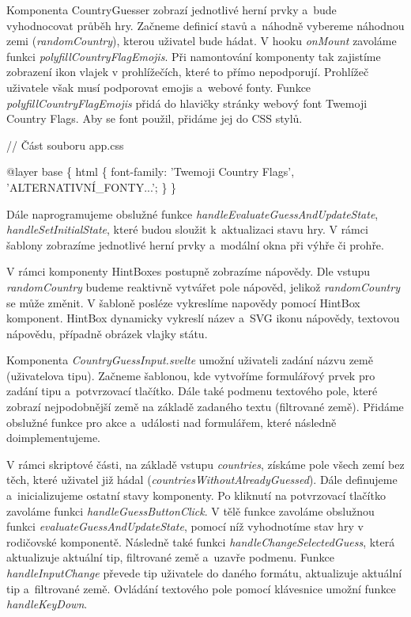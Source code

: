 Komponenta CountryGuesser zobrazí jednotlivé herní prvky a~bude vyhodnocovat průběh hry. 
Začneme definicí stavů a~náhodně vybereme náhodnou zemi (\emph{randomCountry}), kterou uživatel bude hádat. 
V hooku \emph{onMount} zavoláme funkci \emph{polyfillCountryFlagEmojis}. Při namontování komponenty tak zajistíme zobrazení ikon vlajek v prohlížečích, které to přímo nepodporují. 
Prohlížeč uživatele však musí podporovat emojis a~webové fonty. Funkce \emph{polyfillCountryFlagEmojis} přidá do hlavičky stránky webový font Twemoji Country Flags. 
Aby se font použil, přidáme jej do CSS stylů.

\begin{prog}
// Část souboru app.css

@layer base \{
  html \{
    font-family: 'Twemoji Country Flags', 'ALTERNATIVNÍ_FONTY...';
  \}
\}
\end{prog}

Dále naprogramujeme obslužné funkce \emph{handleEvaluateGuessAndUpdateState}, \emph{handleSetInitialState}, které budou sloužit k~aktualizaci stavu hry. 
V rámci šablony zobrazíme jednotlivé herní prvky a~modální okna při výhře či prohře.

V rámci komponenty HintBoxes postupně zobrazíme nápovědy. Dle vstupu \emph{randomCountry} budeme reaktivně vytvářet pole nápověd, jelikož \emph{randomCountry} se může změnit. 
V šabloně posléze vykreslíme napovědy pomocí HintBox komponent. HintBox dynamicky vykreslí název a~SVG ikonu nápovědy, textovou nápovědu, případně obrázek vlajky státu.

Komponenta \emph{CountryGuessInput.svelte} umožní uživateli zadání názvu země (uživatelova tipu). Začneme šablonou, kde vytvoříme formulářový prvek pro zadání tipu a~potvrzovací tlačítko. 
Dále také podmenu textového pole, které zobrazí nejpodobnější země na základě zadaného textu (filtrované země). Přidáme obslužné funkce pro akce a~události nad formulářem, které následně doimplementujeme.

V rámci skriptové části, na základě vstupu \emph{countries}, získáme pole všech zemí bez těch, které uživatel již hádal (\emph{countriesWithoutAlreadyGuessed}). 
Dále definujeme a~inicializujeme ostatní stavy komponenty. Po kliknutí na potvrzovací tlačítko zavoláme funkci \emph{handleGuessButtonClick}. 
V tělě funkce zavoláme obslužnou funkci \emph{evaluateGuessAndUpdateState}, pomocí níž vyhodnotíme stav hry v rodičovské komponentě. 
Následně také funkci \emph{handleChangeSelectedGuess}, která aktualizuje aktuální tip, filtrované země a~uzavře podmenu. 
Funkce \emph{handleInputChange} převede tip uživatele do daného formátu, aktualizuje aktuální tip a~filtrované země. Ovládání textového pole pomocí klávesnice umožní funkce \emph{handleKeyDown}.

